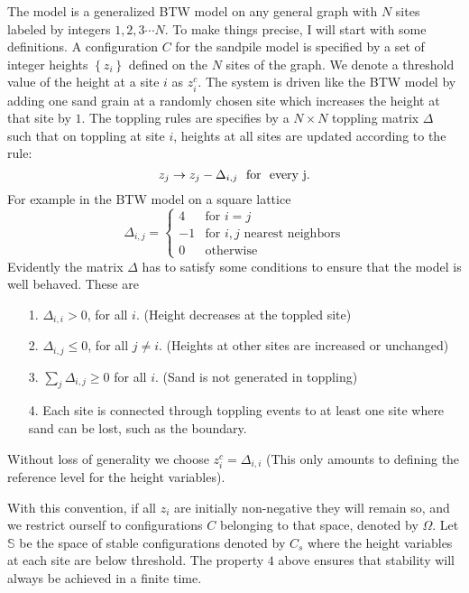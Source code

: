 \documentclass[11pt,a4paper]{book}
\begin{document}
The model is a generalized BTW model on any general graph with $N$ sites labeled
by integers $1,2,3\cdots N$. To make things precise, I will start with
some definitions. A configuration $C$ for the sandpile model is
specified by a set
of integer heights $\left\{ z_{i} \right\}$ defined on the $N$ sites
of the graph. We denote a threshold value of the height at a site $i$ as $z_{i}^{c}$. The system is driven like the BTW
model by adding one sand grain at a randomly chosen site which
increases the height at that site by $1$. The toppling rules are
specifies by a $N\times N$ toppling matrix $\Delta$ such that on toppling at site
$i$, heights at all sites are updated according to the rule: 
\begin{equation}
z_{j}\rightarrow  z_{j}-\Delta_{i,j}  \rm{~ ~ for~ ~ every
~}j.
\end{equation}
For example in the BTW model on a square lattice
\begin{equation}
\Delta_{i,j}=\left\{ \begin{array}{rl}4 &\mbox{for $i=j$}\\-1
&\mbox{for $i,j$ nearest neighbors}\\0 &\mbox{otherwise}\end{array}
\right.
\end{equation}
Evidently the matrix $\Delta$ has to satisfy some conditions to ensure
that the model is well behaved. These are
\begin{itemize}
\item[1.] $\Delta_{i,i}>0$, for all $i$. (Height decreases at the
toppled site)
\item[2.] $\Delta_{i,j}\le0$, for all $j\ne i$. (Heights at other
sites are increased or unchanged)
\item[3.] $\sum_{j}\Delta_{i,j}\ge 0$ for all $i$. (Sand is not
generated in toppling)
\item[4.] Each site is connected through toppling events to at least
one site where sand can be lost, such as the boundary.
\end{itemize}
Without loss of generality we choose $z_{i}^{c}=\Delta_{i,i}$ (This
only amounts to defining the reference level for the height variables).

With this convention, if all $z_{i}$ are initially non-negative they
will remain so, and we restrict ourself to configurations $C$ belonging to
that space, denoted by $\Omega$. Let $\mathbb{S}$ be the space of stable
configurations denoted by $C_{s}$ where the height variables at each
site are below threshold. The property $4$ above ensures that
stability will always be achieved in a finite time.
\end{document}
